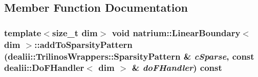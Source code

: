 \subsection{Member Function Documentation}
\hypertarget{classnatrium_1_1LinearBoundary_a649995519912eb058d6ce07939b6e719}{
\subsubsection[{addToSparsityPattern}]{\setlength{\rightskip}{0pt plus 5cm}template$<$size\_\-t dim$>$ void {\bf natrium::LinearBoundary}$<$ dim $>$::addToSparsityPattern (dealii::TrilinosWrappers::SparsityPattern \& {\em cSparse}, \/  const dealii::DoFHandler$<$ dim $>$ \& {\em doFHandler}) const}}
\label{classnatrium_1_1LinearBoundary_a649995519912eb058d6ce07939b6e719}


